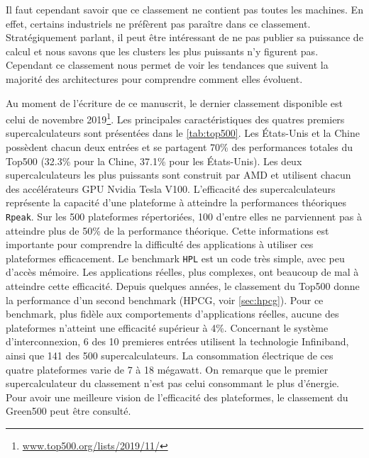         Il faut cependant savoir que ce classement ne contient pas toutes les machines. En effet, certains industriels ne préfèrent pas paraître dans ce classement. Stratégiquement parlant, il peut être intéressant de ne pas publier sa puissance de calcul et nous savons que les clusters les plus puissants n'y figurent pas. Cependant ce classement nous permet de voir les tendances que suivent la majorité des architectures pour comprendre comment elles évoluent.
   
        Au moment de l'écriture de ce manuscrit, le dernier classement disponible est celui de novembre 2019\footnote{\url{www.top500.org/lists/2019/11/}}. Les principales caractéristiques des quatres premiers supercalculateurs sont présentées dans le \autoref{tab:top500}. Les États-Unis et la Chine possèdent chacun deux entrées et se partagent 70\% des performances totales du Top500 (32.3\% pour la Chine, 37.1\% pour les États-Unis).
        Les deux supercalculateurs les plus puissants sont construit par AMD et utilisent chacun des accélérateurs GPU Nvidia Tesla V100.
        L'efficacité des supercalculateurs représente la capacité d'une plateforme à atteindre la performances théoriques \verb|Rpeak|. Sur les 500 plateformes répertoriées, 100 d'entre elles ne parviennent pas à atteindre plus de 50\% de la performance théorique. Cette informations est importante pour comprendre la difficulté des applications à utiliser ces plateformes efficacement. Le benchmark \verb|HPL| est un code très simple, avec peu d'accès mémoire. Les applications réelles, plus complexes, ont beaucoup de mal à atteindre cette efficacité. Depuis quelques années, le classement du Top500 donne la performance d'un second benchmark (HPCG, voir \autoref{sec:hpcg}). Pour ce benchmark, plus fidèle aux comportements d'applications réelles, aucune des plateformes n'atteint une efficacité supérieur à 4\%.
        Concernant le système d'interconnexion, 6 des 10 premieres entrées utilisent la technologie Infiniband, ainsi que 141 des 500 supercalculateurs.
        La consommation électrique de ces quatre plateformes varie de 7 à 18 mégawatt. On remarque que le premier supercalculateur du classement n'est pas celui consommant le plus d'énergie. Pour avoir une meilleure vision de l'efficacité des plateformes, le classement du Green500 peut être consulté.

